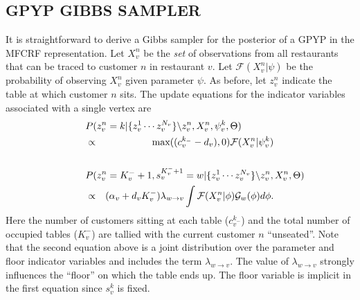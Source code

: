 \documentclass{article}
\newcommand{\comment}[1]{}
\begin{document}
\subsection{GPYP GIBBS SAMPLER} 

\comment{
In samplers based on the MFCRF we need to keep track of a) draws from the base distribution (table labels) and b) which observations are attributed to which draws from the base distribution (assignments of observations to tables) for all vertexes in the DAG.   In the MFCRP, because the base distribution is a mixture, we also need to keep track of which component from the base distribution mixture each draw came.  We call the index of the mixture base distribution component the ``floor.''  
}

It is straightforward to derive a Gibbs sampler for the posterior of a GPYP in the MFCRF representation.  Let $X_v^n$ be the \emph{set} of observations from all restaurants that can be traced to customer $n$ in restaurant $v$.  Let $\mathcal{F}(X_v^n|\psi)$ be the probability of observing $X_v^n$ given parameter $\psi$.  As before, let $z_v^n$ indicate the table at which customer $n$ sits.  The update equations for the indicator variables associated with a single vertex are 
%
\begin{eqnarray}
\lefteqn{P( z_v^{n} = k  | \{z_v^1\cdots z_v^{N_v}\}\backslash z_v^{n}, X_v^n, \psi_v^k, \Theta  )} \nonumber \\
 &\propto& \mbox{max}((c_v^{k_-}-d_v),0)\mathcal{F}(X_v^n|\psi_v^k) \nonumber \\
\nonumber \\
\lefteqn{P(z_v^{n} = K_v^-+1, s_v^{K_v^-+1} = w| \{z_v^1\cdots z_v^{N_v}\}\backslash z_v^{n}, X_v^n, \Theta  )}\nonumber\\ &\propto& (\alpha_v+d_vK^-_v) \lambda_{{w \rightarrow v}} \int \mathcal{F}(X_v^n|\phi) \mathcal{G}_w(\phi)d\phi.
\label{eqn:mfcrp_posterior}
\end{eqnarray}
%
Here the number of customers sitting at each table ($c_v^{k_-}$) and the total number of occupied tables ($K_v^-$) are tallied with the current customer $n$ ``unseated''.  Note that the second equation above is a joint distribution over the parameter and floor indicator variables and includes the term $\lambda_{{w \rightarrow v}}$.   The value of $\lambda_{{w \rightarrow v}}$ strongly influences the ``floor'' on which the table ends up. The floor variable is implicit in the first equation since $s_v^k$ is fixed.
\end{document}

